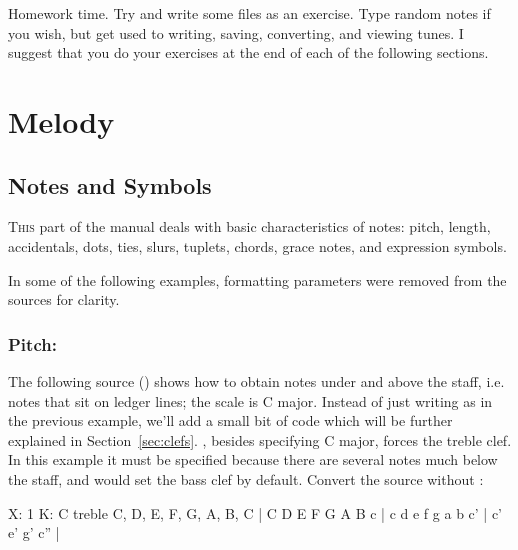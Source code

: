 \documentclass[a4paper,fullpage,12pt]{book}
\begin{document}
Homework time. Try and write some \ABC{} files as an exercise. Type
random notes if you wish, but get used to writing, saving, converting,
and viewing tunes. I suggest that you do your exercises at the end of
each of the following sections.

\noteseparator


\chapter{Melody}

\section{Notes and Symbols}
\label{sec:note}

\lettrine{T}{his} part of the manual deals with basic characteristics
of notes: pitch, length, accidentals, dots, ties, slurs, tuplets,
chords, grace notes, and expression symbols.

\begin{note}

  In some of the following examples, formatting parameters were
  removed from the sources for clarity.

\end{note}


\subsection{Pitch: }
\label{sec:pitch}

The following source () shows how to obtain notes
under and above the staff, i.e. notes that sit on ledger lines; the
scale is C major. Instead of just writing  as in the
previous example, we'll add a small bit of code which will be further
explained in Section~\ref{sec:clefs}. , besides
specifying C major, forces the treble clef. In this example it must be
specified because there are several notes much below the staff, and
\abcm{} would set the bass clef by default. Convert the source without
:

\begin{abcsource}
X: 1
K: C treble
C, D, E, F, G, A, B, C | C D E F G A B c |
c d e f g a b c' | c' e' g' c'' |
\end{abcsource}

\end{document}
